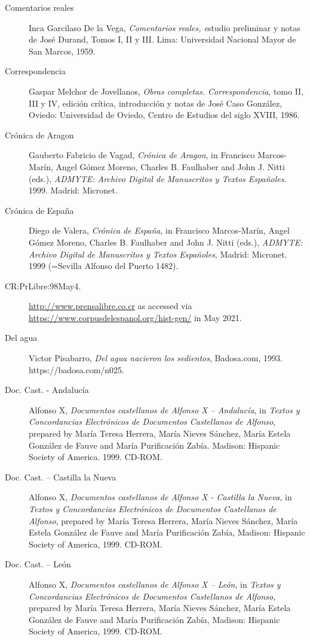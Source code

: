 \begin{flushleft}
\begin{description}
\item[Comentarios reales]Inca Garcilaso De la Vega, \emph{{\textit{Comentarios reales,}}{} {e}}studio preliminar y notas de José Durand, Tomos I, II y III. Lima: Universidad Nacional Mayor de San Marcos, 1959.
\item[Correspondencia]Gaspar Melchor de Jovellanos, \textit{Obras completas. Correspondencia}, tomo II, III y IV, edición crítica, introducción y notas de José Caso González, Oviedo: Universidad de Oviedo, Centro de Estudios del siglo XVIII, 1986.
\item[Crónica de Aragon]Gauberto Fabricio de Vagad, \textit{Crónica de Aragon}, in Francisco Marcos-Marín, Angel Gómez Moreno, Charles B. Faulhaber and John J. Nitti (eds.), \textit{ADMYTE: Archivo Digital de Manuscritos y Textos Españoles}. 1999. Madrid: Micronet.
\item[Crónica de España]Diego de Valera, \textit{Crónica de España}, in Francisco Marcos-Marín, Angel Gómez Moreno, Charles B. Faulhaber and John J. Nitti (eds.), \textit{ADMYTE: Archivo Digital de Manuscritos y Textos Españoles}, Madrid: Micronet. 1999 (=Sevilla Alfonso del Puerto 1482).
\item[CR:PrLibre:98May4.]\url{http://www.prensalibre.co.cr} as accessed via \url{https://www.corpusdelespanol.org/hist-gen/} in May 2021.
\item[Del agua]Victor Pisabarro, \textit{Del agua nacieron los sedientos}, Badosa.com, 1993. https://badosa.com/n025.
\item[Doc. Cast. - Andalucía]Alfonso X, \textit{Documentos castellanos de Alfonso X – Andalucía}, in \textit{Textos y Concordancias Electrónicos de Documentos Castellanos de Alfonso}, prepared by María Teresa Herrera, María Nieves Sánchez, María Estela González de Fauve and María Purificación Zabía. Madison: Hispanic Society of America. 1999. CD-ROM.
\item[Doc. Cast. – Castilla la Nueva]Alfonso X, \textit{Documentos castellanos de Alfonso X - Castilla la Nueva}, in \textit{Textos y Concordancias Electrónicos de Documentos Castellanos de Alfonso}, prepared by María Teresa Herrera, María Nieves Sánchez, María Estela González de Fauve and María Purificación Zabía, Madison: Hispanic Society of America, 1999. CD-ROM.
\item[Doc. Cast. – León]Alfonso X, \textit{Documentos castellanos de Alfonso X – León}, in \textit{Textos y Concordancias Electrónicos de Documentos Castellanos de Alfonso}, prepared by María Teresa Herrera, María Nieves Sánchez, María Estela González de Fauve and María Purificación Zabía, Madison: Hispanic Society of America, 1999. CD-ROM.

\end{description}
\end{flushleft}
